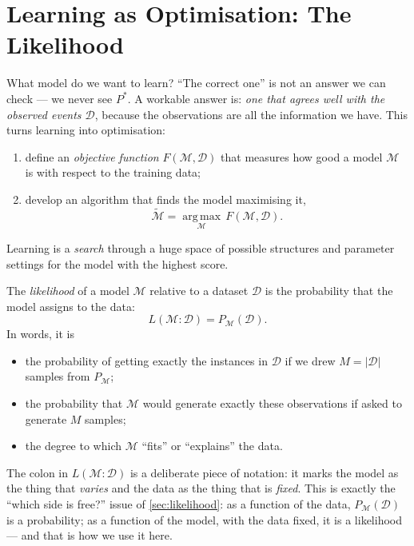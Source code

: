\documentclass[11pt, oneside]{book}
\newcommand{\argmax}{\operatorname*{arg\,max}}
\newcommand{\dataset}{\mathcal{D}}       %
\let\originalsection\section
\renewcommand{\section}{\Needspace{7\baselineskip}\originalsection}
\begin{document}
\section{Learning as Optimisation: The Likelihood}
\label{sec:learning-likelihood}

What model do we want to learn? ``The correct one'' is not an answer we can
check --- we never see $P^*$. A workable answer is: \emph{one that agrees well
with the observed events $\dataset$}, because the observations are all the
information we have. This turns learning into optimisation:
\begin{enumerate}
  \item define an \emph{objective function} $F(\mathcal{M}, \dataset)$ that
    measures how good a model $\mathcal{M}$ is with respect to the training
    data;
  \item develop an algorithm that finds the model maximising it,
    \[
    \tilde{\mathcal{M}} = \argmax_{\mathcal{M}}\, F(\mathcal{M}, \dataset).
    \]
\end{enumerate}
Learning is a \emph{search} through a huge space of possible structures and
parameter settings for the model with the highest score.

\begin{defbox}[title={Likelihood of a model}]
The \emph{likelihood} of a model $\mathcal{M}$ relative to a dataset
$\dataset$ is the probability that the model assigns to the data:
\[
L(\mathcal{M} : \dataset) = P_{\mathcal{M}}(\dataset).
\]
In words, it is
\begin{itemize}
  \item the probability of getting exactly the instances in $\dataset$ if we
    drew $M = |\dataset|$ samples from $P_{\mathcal{M}}$;
  \item the probability that $\mathcal{M}$ would generate exactly these
    observations if asked to generate $M$ samples;
  \item the degree to which $\mathcal{M}$ ``fits'' or ``explains'' the data.
\end{itemize}
\end{defbox}

The colon in $L(\mathcal{M} : \dataset)$ is a deliberate piece of notation:
it marks the model as the thing that \emph{varies} and the data as the thing
that is \emph{fixed}. This is exactly the ``which side is free?'' issue of
\cref{sec:likelihood}: as a function of the data, $P_{\mathcal{M}}(\dataset)$
is a probability; as a function of the model, with the data fixed, it is a
likelihood --- and that is how we use it here.
\end{document}
